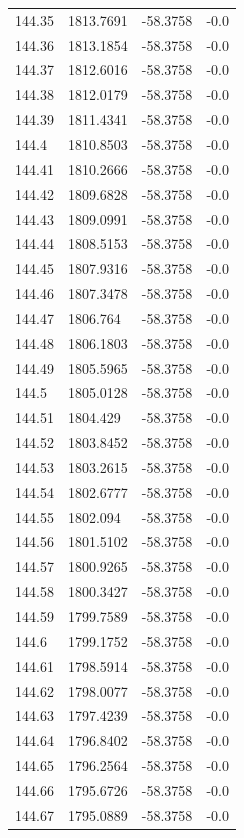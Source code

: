 \begin{table}[H]
\begin{tabular}{llll}
144.35 & 1813.7691 & -58.3758 & -0.0 \\
144.36 & 1813.1854 & -58.3758 & -0.0 \\
144.37 & 1812.6016 & -58.3758 & -0.0 \\
144.38 & 1812.0179 & -58.3758 & -0.0 \\
144.39 & 1811.4341 & -58.3758 & -0.0 \\
144.4 & 1810.8503 & -58.3758 & -0.0 \\
144.41 & 1810.2666 & -58.3758 & -0.0 \\
144.42 & 1809.6828 & -58.3758 & -0.0 \\
144.43 & 1809.0991 & -58.3758 & -0.0 \\
144.44 & 1808.5153 & -58.3758 & -0.0 \\
144.45 & 1807.9316 & -58.3758 & -0.0 \\
144.46 & 1807.3478 & -58.3758 & -0.0 \\
144.47 & 1806.764 & -58.3758 & -0.0 \\
144.48 & 1806.1803 & -58.3758 & -0.0 \\
144.49 & 1805.5965 & -58.3758 & -0.0 \\
144.5 & 1805.0128 & -58.3758 & -0.0 \\
144.51 & 1804.429 & -58.3758 & -0.0 \\
144.52 & 1803.8452 & -58.3758 & -0.0 \\
144.53 & 1803.2615 & -58.3758 & -0.0 \\
144.54 & 1802.6777 & -58.3758 & -0.0 \\
144.55 & 1802.094 & -58.3758 & -0.0 \\
144.56 & 1801.5102 & -58.3758 & -0.0 \\
144.57 & 1800.9265 & -58.3758 & -0.0 \\
144.58 & 1800.3427 & -58.3758 & -0.0 \\
144.59 & 1799.7589 & -58.3758 & -0.0 \\
144.6 & 1799.1752 & -58.3758 & -0.0 \\
144.61 & 1798.5914 & -58.3758 & -0.0 \\
144.62 & 1798.0077 & -58.3758 & -0.0 \\
144.63 & 1797.4239 & -58.3758 & -0.0 \\
144.64 & 1796.8402 & -58.3758 & -0.0 \\
144.65 & 1796.2564 & -58.3758 & -0.0 \\
144.66 & 1795.6726 & -58.3758 & -0.0 \\
144.67 & 1795.0889 & -58.3758 & -0.0 \\

\end{tabular}
\end{table}

